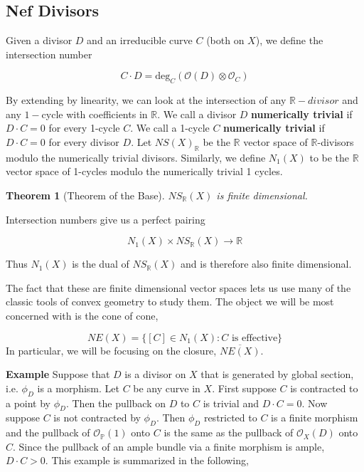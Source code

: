 \documentclass[a4paper]{article}
\newtheorem{theorem}{Theorem}
\numberwithin{theorem}{section}
\begin{document}
\subsection{Nef Divisors}

Given a divisor $D$ and an irreducible curve $C$ (both on $X$), we define the intersection number 

$$C \cdot D = \text{deg}_C (\mathcal{O}(D) \otimes \mathcal{O}_C) $$

By extending by linearity, we can look at the intersection of any $\mathbb{R}-divisor$ and any $1-$cycle with coefficients in $\mathbb{R}$. We call a divisor $D$ \textbf{numerically trivial} if $D \cdot C = 0$ for every 1-cycle $C$. We call a 1-cycle $C$ \textbf{numerically trivial} if $D \cdot C = 0$ for every divisor $D$. Let $NS(X)_{\mathbb{R}}$ be the $\mathbb{R}$ vector space of $\mathbb{R}$-divisors modulo the numerically trivial divisors. Similarly, we define $N_1(X)$ to be the $\mathbb{R}$ vector space of 1-cycles modulo the numerically trivial 1 cycles.

\begin{theorem}[Theorem of the Base]
$NS_\mathbb{R}(X)$ is finite dimensional.
\end{theorem}

Intersection numbers give us a perfect pairing

$$ N_1(X) \times NS_\mathbb{R}(X) \rightarrow \mathbb{R} $$

Thus $N_1(X)$ is the dual of $NS_\mathbb{R}(X)$ and is therefore also finite dimensional.

The fact that these are finite dimensional vector spaces lets us use many of the classic tools of convex geometry to study them. The object we will be most concerned with is the cone of cone,

$$ NE(X) = \{ [C] \in N_1(X) : C \text{ is effective} \} $$In particular, we will be focusing on the closure, $\overline{NE(X)}$.

\textbf{Example} Suppose that $D$ is a divisor on $X$ that is generated by global section, i.e. $\phi_D$ is a morphism. Let $C$ be any curve in $X$. First suppose $C$ is contracted to a point by $\phi_D$. Then the pullback on $D$ to $C$ is trivial and $D\cdot C = 0$. Now suppose $C$ is not contracted by $\phi_D$. Then $\phi_D$ restricted to $C$ is a finite morphism and the pullback of $\mathcal{O}_\mathbb{P}(1)$ onto $C$ is the same as the pullback of $\mathcal{O}_X(D)$ onto $C$. Since the pullback of an ample bundle via a finite morphism is ample, $D \cdot C > 0$. This example is summarized in the following,
\end{document}

